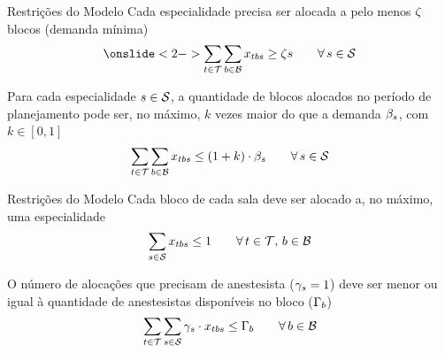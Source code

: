 \documentclass[10pt]{beamer}
\begin{document}
\begin{frame}{Restrições do Modelo}
    Cada especialidade precisa ser alocada a pelo menos $\zeta$ blocos (demanda mínima)
    \begin{equation}
    \onslide<2->\label{eq:m2-2}
        \sum_{\roomidx \in \roomset} \sum_{\blockidx \in \blockset} \blockvar \geq \mindeficit{\specialtyidx} \hspace{2em} \forall\, \specialtyidx \in \specialtyset
    \end{equation}
    \vspace{2em}

    Para cada especialidade $s \in \mathcal{S}$, a quantidade de blocos alocados no período de planejamento pode ser, no máximo, $k$ vezes maior do que a demanda $\beta_{s}$, com $k \in [0,1]$
    \begin{equation}
    \label{eq:m2-3}
        \sum_{t \in \mathcal{T}} \sum_{b \in \mathcal{B}} x_{tbs} \leq (1 + k) \cdot \beta_{s} \hspace{2em} \forall\, s \in \mathcal{S}
    \end{equation}
\end{frame}


\begin{frame}{Restrições do Modelo}
    Cada bloco de cada sala deve ser alocado a, no máximo, uma especialidade
    \begin{equation}
    \label{eq:m2-4}
        \sum_{s \in \mathcal{S}} x_{tbs} \leq 1 \hspace{2em} \forall\, t \in \mathcal{T},\, b \in \mathcal{B}
    \end{equation}
    \vspace{2em}

    O número de alocações que precisam de anestesista ($\gamma_s = 1$) deve ser menor ou igual à quantidade de anestesistas disponíveis no bloco ($\Gamma_{b}$)
    \begin{equation}
    \label{eq:m2-5}
        \sum_{t \in \mathcal{T}} \sum_{s \in \mathcal{S}} \gamma_{s} \cdot x_{tbs} \leq \Gamma_{b} \hspace{2em} \forall\, b \in \mathcal{B}
    \end{equation}
\end{frame}
\end{document}
